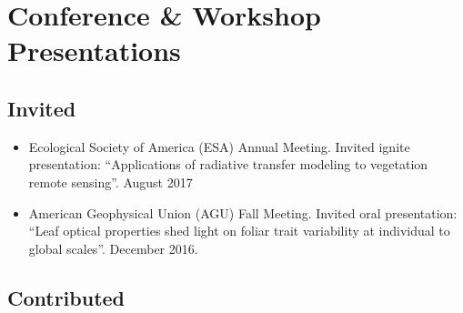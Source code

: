 \section*{Conference \& Workshop Presentations}

\subsection*{Invited}

\begin{itemize}
  \item Ecological Society of America (ESA) Annual Meeting.
  Invited ignite presentation: ``Applications of radiative transfer modeling to vegetation remote sensing''.
  August 2017

  \item American Geophysical Union (AGU) Fall Meeting.
  Invited oral presentation: ``Leaf optical properties shed light on foliar trait variability at individual to global scales''.
  December 2016.
\end{itemize}

\subsection*{Contributed}

